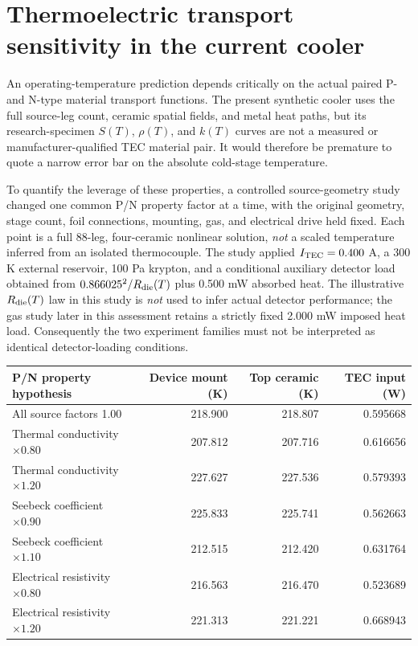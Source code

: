 \clearpage
\section{Thermoelectric transport sensitivity in the current cooler}
\label{sec:current-material-sensitivity}
An operating-temperature prediction depends critically on the actual paired
P- and N-type material transport functions. The present synthetic cooler uses
the full source-leg count, ceramic spatial fields, and metal heat paths, but
its research-specimen \(S(T)\), \(\rho(T)\), and \(k(T)\) curves are not a
measured or manufacturer-qualified TEC material pair. It would therefore be
premature to quote a narrow error bar on the absolute cold-stage temperature.

To quantify the leverage of these properties, a controlled source-geometry
study changed one common P/N property factor at a time, with the original
geometry, stage count, foil connections, mounting, gas, and electrical drive
held fixed. Each point is a full 88-leg, four-ceramic nonlinear solution,
\emph{not} a scaled temperature inferred from an isolated thermocouple.
The study applied \(I_{\rm TEC}=0.400\) A, a 300 K external reservoir, 100 Pa
krypton, and a conditional auxiliary detector load obtained from
\(0.866025^2/R_{\rm die}(T)\) plus 0.500 mW absorbed heat. The illustrative
\(R_{\rm die}(T)\) law in this study is \emph{not} used to infer actual detector
performance; the gas study later in this assessment retains a strictly fixed
2.000 mW imposed heat load. Consequently the two experiment families
must not be interpreted as identical detector-loading conditions.

\begin{center}\small
\begin{tabular}{lrrr}\toprule
P/N property hypothesis & Device mount (K) & Top ceramic (K) & TEC input (W)\\\midrule
All source factors 1.00 & 218.900 & 218.807 & 0.595668\\
Thermal conductivity \(\times0.80\) & 207.812 & 207.716 & 0.616656\\
Thermal conductivity \(\times1.20\) & 227.627 & 227.536 & 0.579393\\
Seebeck coefficient \(\times0.90\) & 225.833 & 225.741 & 0.562663\\
Seebeck coefficient \(\times1.10\) & 212.515 & 212.420 & 0.631764\\
Electrical resistivity \(\times0.80\) & 216.563 & 216.470 & 0.523689\\
Electrical resistivity \(\times1.20\) & 221.313 & 221.221 & 0.668943\\\bottomrule
\end{tabular}
\end{center}

